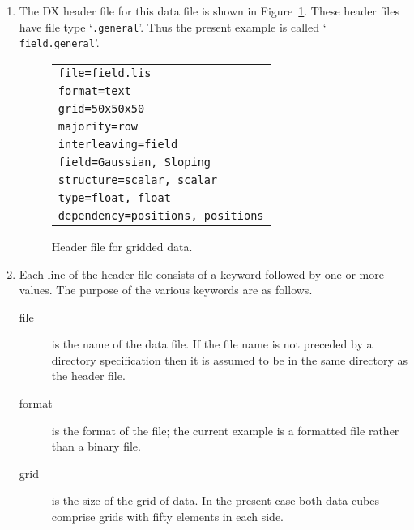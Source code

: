 \begin{enumerate}

  \item The DX header file for this data file is shown in
   Figure~\ref{FIELD.GENERAL}. These header files have file type
   `{\tt .general}'. Thus the present example is called `{\tt
   field.general}'. 

  \begin{figure}[htbp]

  \begin{center}
  \begin{tabular}{l}
   {\tt file=field.lis}       \\
   {\tt format=text}               \\
   {\tt grid=50x50x50}             \\
   {\tt majority=row}              \\
   {\tt interleaving=field}        \\
   {\tt field=Gaussian, Sloping}   \\
   {\tt structure=scalar, scalar}  \\
   {\tt type=float, float}         \\
   {\tt dependency=positions, positions} \\
  \end{tabular}
  \end{center}

  \caption[Header file for gridded data.]{Header file for gridded data.
  \label{FIELD.GENERAL} }

  \end{figure}

  \item Each line of the header file consists of a keyword followed by
   one or more values. The purpose of the various keywords are as
   follows.

  \begin{description}

    \item[file] is the name of the data file. If the file name is not
     preceded by a directory specification then it is assumed to be in
     the same directory as the header file.

    \item[format] is the format of the file; the current example is
     a formatted file rather than a binary file.

    \item[grid] is the size of the grid of data. In the present case
     both data cubes comprise grids with fifty elements in each side.


\end{description}
\end{enumerate}
